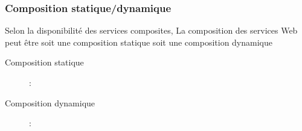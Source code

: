       \subsubsection{Composition statique/dynamique}
      \label{sec:comp-stat}
      Selon la disponibilité des services composites, La composition
      des services Web peut être soit une composition statique soit
      une composition dynamique

      \SpecialItem
      \begin{description}
      \item[Composition statique] :



      \item[Composition dynamique] :


\end{description}
